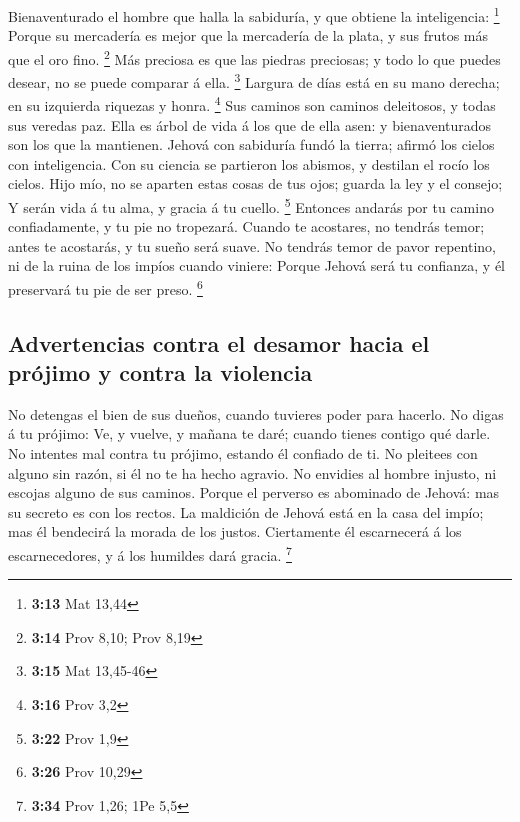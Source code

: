  Bienaventurado el hombre que halla la sabiduría, y que
obtiene la inteligencia: \footnote{\textbf{3:13} Mat 13,44}
 Porque su mercadería es mejor que la mercadería de la
plata, y sus frutos más que el oro fino. \footnote{\textbf{3:14} Prov
  8,10; Prov 8,19}  Más preciosa es que las piedras
preciosas; y todo lo que puedes desear, no se puede comparar á ella.
\footnote{\textbf{3:15} Mat 13,45-46}  Largura de días está
en su mano derecha; en su izquierda riquezas y honra. \footnote{\textbf{3:16}
  Prov 3,2}  Sus caminos son caminos deleitosos, y todas
sus veredas paz.  Ella es árbol de vida á los que de ella
asen: y bienaventurados son los que la mantienen.  Jehová
con sabiduría fundó la tierra; afirmó los cielos con inteligencia.
 Con su ciencia se partieron los abismos, y destilan el
rocío los cielos.  Hijo mío, no se aparten estas cosas de
tus ojos; guarda la ley y el consejo;  Y serán vida á tu
alma, y gracia á tu cuello. \footnote{\textbf{3:22} Prov 1,9}
 Entonces andarás por tu camino confiadamente, y tu pie no
tropezará.  Cuando te acostares, no tendrás temor; antes te
acostarás, y tu sueño será suave.  No tendrás temor de
pavor repentino, ni de la ruina de los impíos cuando viniere:
 Porque Jehová será tu confianza, y él preservará tu pie de
ser preso. \footnote{\textbf{3:26} Prov 10,29}

\hypertarget{advertencias-contra-el-desamor-hacia-el-pruxf3jimo-y-contra-la-violencia}{%
\subsection{Advertencias contra el desamor hacia el prójimo y contra la
violencia}\label{advertencias-contra-el-desamor-hacia-el-pruxf3jimo-y-contra-la-violencia}}

 No detengas el bien de sus dueños, cuando tuvieres poder
para hacerlo.  No digas á tu prójimo: Ve, y vuelve, y
mañana te daré; cuando tienes contigo qué darle.  No
intentes mal contra tu prójimo, estando él confiado de ti. 
No pleitees con alguno sin razón, si él no te ha hecho agravio.
 No envidies al hombre injusto, ni escojas alguno de sus
caminos.  Porque el perverso es abominado de Jehová: mas su
secreto es con los rectos.  La maldición de Jehová está en
la casa del impío; mas él bendecirá la morada de los justos.
 Ciertamente él escarnecerá á los escarnecedores, y á los
humildes dará gracia. \footnote{\textbf{3:34} Prov 1,26; 1Pe 5,5}


